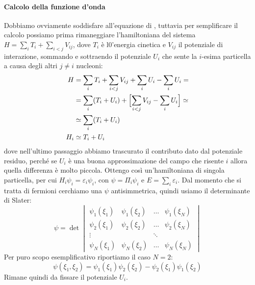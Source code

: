 \paragraph{Calcolo della funzione d'onda} Dobbiamo ovviamente soddisfare all'equazione di \Sch, tuttavia per semplificare il calcolo possiamo prima rimaneggiare l'hamiltoniana del sistema $H=\sum_i T_i + \sum_{i<j}V_{ij}$, dove $T_i$ è l0'energia cinetica e $V_{ij}$ il potenziale di interazione, sommando e sottraendo il potenziale $U_i$ che sente la $i$-esima particella a causa degli altri $j\not =i$ nucleoni:
\begin{displaymath}
\begin{aligned}
H&=\sum_i T_i + \sum_{i<j}V_{ij} +\sum_i U_i - \sum_i U_i=\\
&= \sum_i (T_i + U_i) + \Bigl [ \sum_{i<j} V_{ij} - \sum_i U_i \Bigr ] \simeq\\
&\simeq \sum_i (T_i + U_i)\\
H_i &\simeq T_i + U_i
\end{aligned}
\end{displaymath}
dove nell'ultimo passaggio abbiamo trascurato il contributo dato dal potenziale residuo, perché se $U_i$ è una buona approssimazione del campo che risente $i$ allora quella differenza è molto piccola. Ottengo così un'hamiltoniana di singola particella, per cui $H_i \psi_i = \varepsilon_i \psi_i$, con $\psi = \Pi_i \psi_i$ e $E = \sum_i \varepsilon_i$. Dal momento che si tratta di fermioni cerchiamo una $\psi$ antisimmetrica, quindi usiamo il determinante di Slater:
\begin{displaymath}
\psi = \det
\begin{vmatrix}
\psi_1 (\xi_1) & \psi_1 (\xi_2) & \dots & \psi_1 (\xi_N) \\
\psi_2 (\xi_1) & \psi_2 (\xi_2) & \dots & \psi_2 (\xi_N) \\
\vdots &  & \ddots & \\
\psi_N (\xi_1) & \psi_N (\xi_2) & \dots & \psi_N (\xi_N)
\end{vmatrix}
\end{displaymath}
Per puro scopo esemplificativo riportiamo il caso $N=2$:
$$\psi (\xi_1,\xi_2) = \psi_1 (\xi_1)\psi_2 (\xi_2) - \psi_2 (\xi_1)\psi_1 (\xi_2)$$
Rimane quindi da fissare il potenziale $U_i$.
